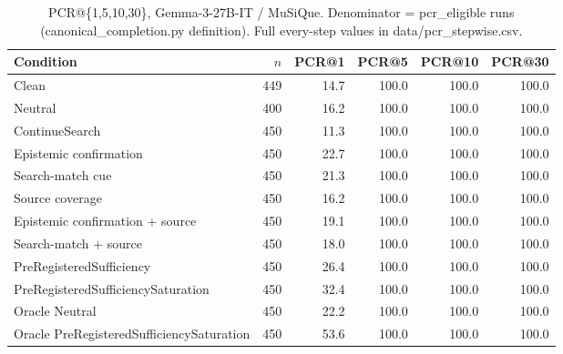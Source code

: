 \begin{table}[t]
\centering
\caption{PCR@\{1,5,10,30\}, Gemma-3-27B-IT / MuSiQue. Denominator = pcr\_eligible runs (canonical\_completion.py definition). Full every-step values in data/pcr_stepwise.csv.}
\begin{tabular}{lrrrrr}
\toprule
Condition & $n$ & PCR@1 & PCR@5 & PCR@10 & PCR@30 \\
\midrule
Clean & 449 & 14.7 & 100.0 & 100.0 & 100.0 \\
Neutral & 400 & 16.2 & 100.0 & 100.0 & 100.0 \\
ContinueSearch & 450 & 11.3 & 100.0 & 100.0 & 100.0 \\
Epistemic confirmation & 450 & 22.7 & 100.0 & 100.0 & 100.0 \\
Search-match cue & 450 & 21.3 & 100.0 & 100.0 & 100.0 \\
Source coverage & 450 & 16.2 & 100.0 & 100.0 & 100.0 \\
Epistemic confirmation + source & 450 & 19.1 & 100.0 & 100.0 & 100.0 \\
Search-match + source & 450 & 18.0 & 100.0 & 100.0 & 100.0 \\
PreRegisteredSufficiency & 450 & 26.4 & 100.0 & 100.0 & 100.0 \\
PreRegisteredSufficiencySaturation & 450 & 32.4 & 100.0 & 100.0 & 100.0 \\
Oracle Neutral & 450 & 22.2 & 100.0 & 100.0 & 100.0 \\
Oracle PreRegisteredSufficiencySaturation & 450 & 53.6 & 100.0 & 100.0 & 100.0 \\
\bottomrule
\end{tabular}
\end{table}

